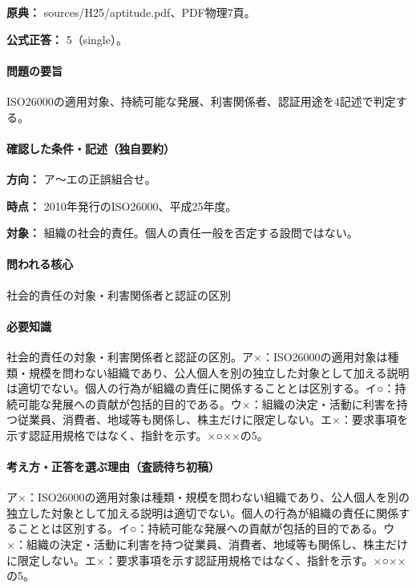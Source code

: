 \noindent\textbf{原典：} sources/H25/aptitude.pdf、PDF物理7頁。

\textbf{公式正答：} 5（single）。

\paragraph{問題の要旨} ISO26000の適用対象、持続可能な発展、利害関係者、認証用途を4記述で判定する。

\paragraph{確認した条件・記述（独自要約）}\mbox{}\par

\noindent\textbf{方向：} ア〜エの正誤組合せ。\par

\noindent\textbf{時点：} 2010年発行のISO26000、平成25年度。\par

\noindent\textbf{対象：} 組織の社会的責任。個人の責任一般を否定する設問ではない。\par

\paragraph{問われる核心} 社会的責任の対象・利害関係者と認証の区別

\paragraph{必要知識} 社会的責任の対象・利害関係者と認証の区別。ア×：ISO26000の適用対象は種類・規模を問わない組織であり、公人個人を別の独立した対象として加える説明は適切でない。個人の行為が組織の責任に関係することとは区別する。イ○：持続可能な発展への貢献が包括的目的である。ウ×：組織の決定・活動に利害を持つ従業員、消費者、地域等も関係し、株主だけに限定しない。エ×：要求事項を示す認証用規格ではなく、指針を示す。×○××の5。

\paragraph{考え方・正答を選ぶ理由（査読待ち初稿）} ア×：ISO26000の適用対象は種類・規模を問わない組織であり、公人個人を別の独立した対象として加える説明は適切でない。個人の行為が組織の責任に関係することとは区別する。イ○：持続可能な発展への貢献が包括的目的である。ウ×：組織の決定・活動に利害を持つ従業員、消費者、地域等も関係し、株主だけに限定しない。エ×：要求事項を示す認証用規格ではなく、指針を示す。×○××の5。

